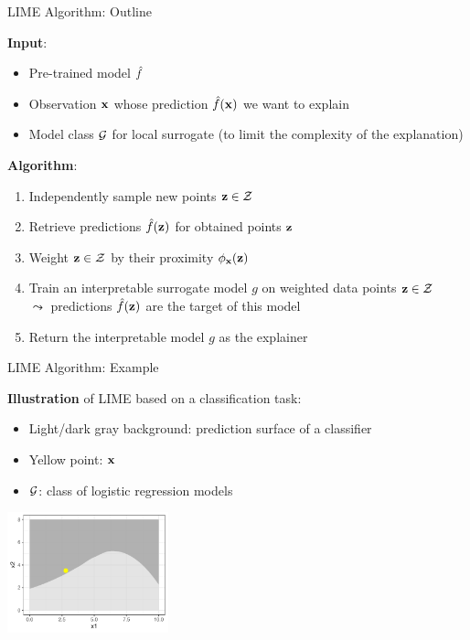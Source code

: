 \documentclass[11pt,compress,t,notes=noshow, aspectratio=169, xcolor=table]{beamer}
\begin{document}
\begin{frame}[c]{LIME Algorithm: Outline}
		
		\textbf{Input}:
		\begin{itemize}
		    \item Pre-trained model $\fh$
		    \item Observation $\xv$ whose prediction $\fh(\xv)$ we want to explain
		    \item Model class $\Gspace$ for local surrogate (to limit the complexity of the explanation)
		\end{itemize}
		
		\pause
		\medskip
		
		\textbf{Algorithm}:
		\begin{enumerate}
    		\item Independently sample new points $\zv \in \Zspace$ 
    		\item Retrieve predictions $\fh(\zv)$ for obtained points $\zv$ 
    		\item Weight $\zv \in \Zspace$ by their proximity $\neigh(\zv)$
    		\item Train an interpretable surrogate model $g$ on weighted data points $\zv \in \Zspace$\\ $\leadsto$ predictions $\fh(\zv)$ are the target of this model
    		\item Return the interpretable model $g$ as the explainer
		\end{enumerate}
		

	
\end{frame} 

\begin{frame}[c]{LIME Algorithm: Example}

    	\textbf{Illustration} of LIME based on a classification task:
		\begin{itemize}
			\item Light/dark gray background: prediction surface of a classifier
			\item Yellow point: $\xv$ 
			\item $\Gspace$: class of logistic regression models 
		\end{itemize}
		\begin{center}
			\includegraphics[width=0.35\textwidth]{figure/lime2}
		\end{center}

\end{frame} 
\end{document}
